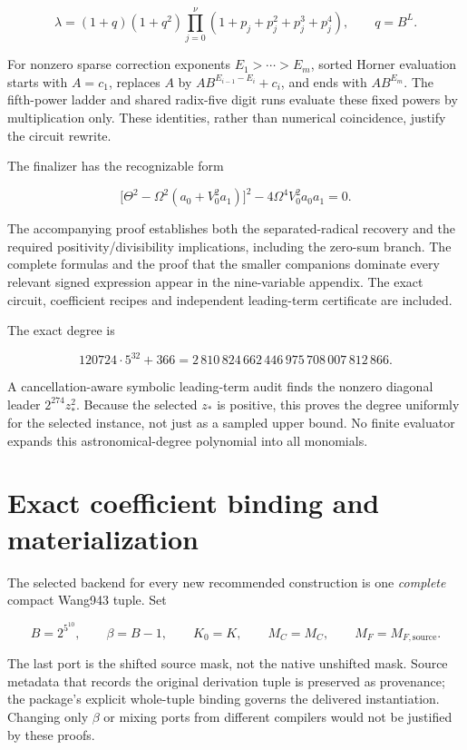 \documentclass[
  10pt,
]{article}
\let\oldsection\section
\renewcommand{\section}{\clearpage\oldsection}
\begin{document}
\[\lambda=(1+q)(1+q^2)\prod_{j=0}^{\nu}(1+p_j+p_j^2+p_j^3+p_j^4),\qquad q=B^L.\]

For nonzero sparse correction exponents \(E_1>\cdots>E_m\), sorted
Horner evaluation starts with \(A=c_1\), replaces \(A\) by
\(AB^{E_{i-1}-E_i}+c_i\), and ends with \(AB^{E_m}\). The fifth-power
ladder and shared radix-five digit runs evaluate these fixed powers by
multiplication only. These identities, rather than numerical
coincidence, justify the circuit rewrite.

The finalizer has the recognizable form

\[\bigl[\Theta^2-\Omega^2(a_0+V_0^2a_1)\bigr]^2
-4\Omega^4V_0^2a_0a_1=0.\]

The accompanying proof establishes both the separated-radical recovery
and the required positivity/divisibility implications, including the
zero-sum branch. The complete formulas and the proof that the smaller
companions dominate every relevant signed expression appear in the
nine-variable appendix. The exact circuit, coefficient recipes and
independent leading-term certificate are included.

The exact degree is

\[120724\cdot5^{32}+366
=2\,810\,824\,662\,446\,975\,708\,007\,812\,866.\]

A cancellation-aware symbolic leading-term audit finds the nonzero
diagonal leader \(2^{274}z_*^2\). Because the selected \(z_*\) is
positive, this proves the degree uniformly for the selected instance,
not just as a sampled upper bound. No finite evaluator expands this
astronomical-degree polynomial into all monomials.

\section{Exact coefficient binding and
materialization}\label{exact-coefficient-binding-and-materialization}

The selected backend for every new recommended construction is one
\emph{complete} compact Wang943 tuple. Set

\[B=2^{5^{10}},\qquad\beta=B-1,\qquad
K_0=K,\qquad M_C=M_C,\qquad M_F=M_{F,\mathrm{source}}.\]

The last port is the shifted source mask, not the native unshifted mask.
Source metadata that records the original derivation tuple is preserved
as provenance; the package's explicit whole-tuple binding governs the
delivered instantiation. Changing only \(\beta\) or mixing ports from
different compilers would not be justified by these proofs.
\end{document}
